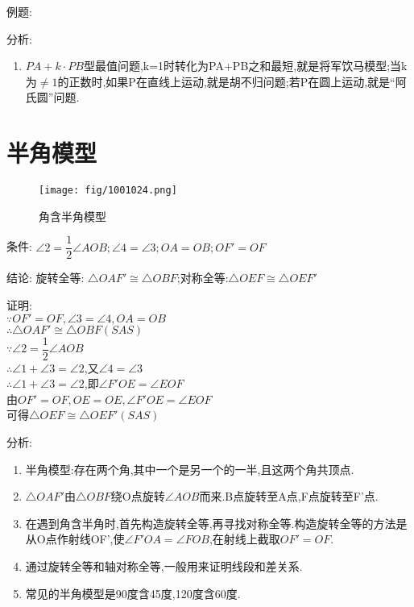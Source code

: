 \documentclass[cn,blue,10pt]{elegantbook}
\begin{document}
例题:


分析: 
\begin{enumerate}
    \item \(PA+k\cdot PB\)型最值问题,k=1时转化为PA+PB之和最短,就是将军饮马模型;当k为\(\ne 1\)的正数时,如果P在直线上运动,就是胡不归问题;若P在圆上运动,就是``阿氏圆''问题.
\end{enumerate}


\section{半角模型}%
\label{sec:半角模型}

\begin{figure}[h]
    \centering
    \texttt{[image: fig/1001024.png]}
    \caption{角含半角模型}%
    \label{fig:倒数型相似}
\end{figure}
条件: \(\angle 2=\dfrac{1}{2}\angle AOB;\angle 4=\angle 3;OA=OB; OF'=OF\) 

结论: 旋转全等: \(\triangle OAF'\cong\triangle OBF\);对称全等:\(\triangle OEF \cong \triangle OEF'\) 

证明:\\
\(\because OF'=OF, \angle 3=\angle 4, OA=OB\)\\
\(\therefore \triangle OAF'\cong \triangle OBF(SAS)\)\\
\(\because \angle 2 = \dfrac{1}{2}\angle AOB\)\\
\(\therefore \angle 1 + \angle 3 = \angle 2\),又\(\angle 4 = \angle 3\)\\
\(\therefore \angle 1 + \angle 3 = \angle 2\),即\(\angle F'OE = \angle EOF\)\\
由\(OF'=OF, OE=OE, \angle F'OE = \angle EOF\)\\
可得\(\triangle OEF \cong \triangle OEF' (SAS)\)

分析:
\begin{enumerate}
    \item 半角模型:存在两个角,其中一个是另一个的一半,且这两个角共顶点.
    \item \(\triangle OAF'\)由\(\triangle OBF\)绕O点旋转\(\angle AOB\)而来.B点旋转至A点,F点旋转至F'点.
    \item 在遇到角含半角时,首先构造旋转全等,再寻找对称全等.构造旋转全等的方法是从O点作射线OF',使\(\angle F'OA = \angle FOB\),在射线上截取\(OF'=OF\).
    \item 通过旋转全等和轴对称全等,一般用来证明线段和差关系.
    \item 常见的半角模型是90度含45度,120度含60度.
\end{enumerate}
\end{document}
